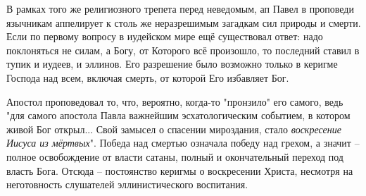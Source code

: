 В рамках того же религиозного трепета перед неведомым, ап Павел в проповеди язычникам аппелирует к столь же неразрешимым загадкам сил природы и смерти.
Если по первому вопросу в иудейском мире ещё существовал ответ: надо поклоняться не силам, а Богу, от Которого всё произошло, то последний ставил в тупик и иудеев, и эллинов.
Его разрешение было возможно только в керигме Господа над всем, включая смерть, от которой Его избавляет Бог.


Апостол проповедовал то, что, вероятно, когда-то "пронзило" его самого, ведь "для самого апостола Павла важнейшим эсхатологическим событием, в котором живой Бог открыл... Свой замысел о спасении мироздания, стало \textit{воскресение Иисуса из мёртвых}"\cite{@wright.4to}.
Победа над смертью означала победу над грехом, а значит – полное освобождение от власти сатаны, полный и окончательный переход под власть Бога.
Отсюда – постоянство керигмы о воскресении Христа, несмотря на неготовность слушателей эллинистического воспитания.




